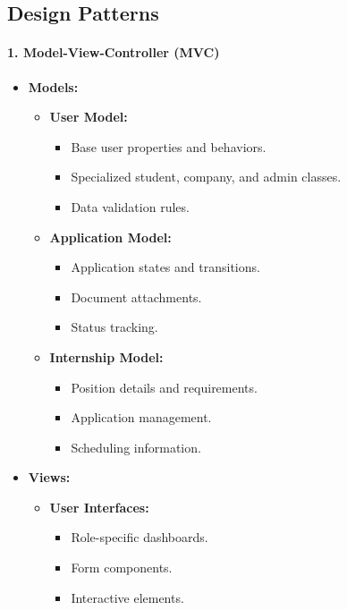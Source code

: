 \subsection{Design Patterns}
\label{subsec:design_patterns}

\paragraph{1. Model-View-Controller (MVC)}
\begin{itemize}
    \item \textbf{Models:}
    \begin{itemize}
        \item \textbf{User Model:}
        \begin{itemize}
            \item Base user properties and behaviors.
            \item Specialized student, company, and admin classes.
            \item Data validation rules.
        \end{itemize}
        \item \textbf{Application Model:}
        \begin{itemize}
            \item Application states and transitions.
            \item Document attachments.
            \item Status tracking.
        \end{itemize}
        \item \textbf{Internship Model:}
        \begin{itemize}
            \item Position details and requirements.
            \item Application management.
            \item Scheduling information.
        \end{itemize}
    \end{itemize}
    \item \textbf{Views:}
    \begin{itemize}
        \item \textbf{User Interfaces:}
        \begin{itemize}
            \item Role-specific dashboards.
            \item Form components.
            \item Interactive elements.

\end{itemize}
\end{itemize}
\end{itemize}

